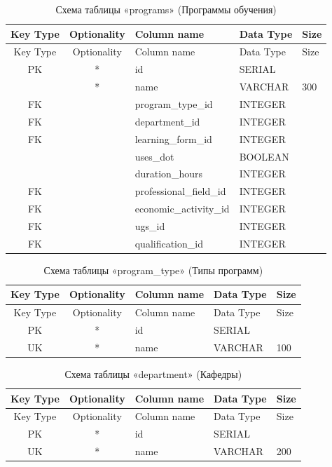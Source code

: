 \begin{xltabular}{\textwidth}{|c|c|l|l|X|}
	\caption{Схема таблицы «programs» (Программы обучения)\label{tab:programs}}\\ \hline
	\centrow Key Type & \centrow Optionality & \centrow Column name & \centrow Data Type & \centrow Size \\ \hline
	\endfirsthead
	\centrow Key Type & \centrow Optionality & \centrow Column name & \centrow Data Type & \centrow Size \\ \hline
	\finishhead
	PK & * & id & SERIAL & \\ \hline
	& * & name & VARCHAR & 300 \\ \hline
	FK & & program\_type\_id & INTEGER & \\ \hline
	FK & & department\_id & INTEGER & \\ \hline
	FK & & learning\_form\_id & INTEGER & \\ \hline
	& & uses\_dot & BOOLEAN & \\ \hline
	& & duration\_hours & INTEGER & \\ \hline
	FK & & professional\_field\_id & INTEGER & \\ \hline
	FK & & economic\_activity\_id & INTEGER & \\ \hline
	FK & & ugs\_id & INTEGER & \\ \hline
	FK & & qualification\_id & INTEGER & \\ \hline
\end{xltabular}

\begin{xltabular}{\textwidth}{|c|c|l|l|X|}
	\caption{Схема таблицы «program\_type» (Типы программ)\label{tab:program_type}}\\ \hline
	\centrow Key Type & \centrow Optionality & \centrow Column name & \centrow Data Type & \centrow Size \\ \hline
	\endfirsthead
	\centrow Key Type & \centrow Optionality & \centrow Column name & \centrow Data Type & \centrow Size \\ \hline
	\finishhead
	PK & * & id & SERIAL & \\ \hline
	UK & * & name & VARCHAR & 100 \\ \hline
\end{xltabular}

\begin{xltabular}{\textwidth}{|c|c|l|l|X|}
	\caption{Схема таблицы «department» (Кафедры)\label{tab:department}}\\ \hline
	\centrow Key Type & \centrow Optionality & \centrow Column name & \centrow Data Type & \centrow Size \\ \hline
	\endfirsthead
	\centrow Key Type & \centrow Optionality & \centrow Column name & \centrow Data Type & \centrow Size \\ \hline
	\finishhead
	PK & * & id & SERIAL & \\ \hline
	UK & * & name & VARCHAR & 200 \\ \hline
\end{xltabular}

